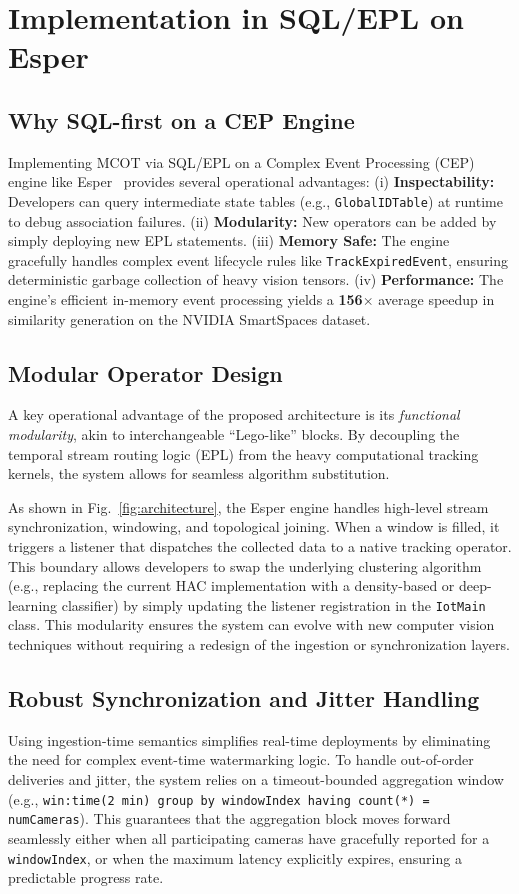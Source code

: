 \documentclass[11pt]{article}
\begin{document}
\section{Implementation in SQL/EPL on Esper}\label{sec:implementation}
\subsection{Why SQL-first on a CEP Engine}
Implementing MCOT via SQL/EPL on a Complex Event Processing (CEP) engine like Esper~\cite{espertech2024} provides several operational advantages: (i) \textbf{Inspectability:} Developers can query intermediate state tables (e.g., \texttt{GlobalIDTable}) at runtime to debug association failures. (ii) \textbf{Modularity:} New operators can be added by simply deploying new EPL statements. (iii) \textbf{Memory Safe:} The engine gracefully handles complex event lifecycle rules like \texttt{TrackExpiredEvent}, ensuring deterministic garbage collection of heavy vision tensors. (iv) \textbf{Performance:} The engine's efficient in-memory event processing yields a \textbf{156$\times$} average speedup in similarity generation on the NVIDIA SmartSpaces dataset.

\subsection{Modular Operator Design}
A key operational advantage of the proposed architecture is its \emph{functional modularity}, akin to interchangeable ``Lego-like'' blocks. By decoupling the temporal stream routing logic (EPL) from the heavy computational tracking kernels, the system allows for seamless algorithm substitution. 

As shown in Fig.~\ref{fig:architecture}, the Esper engine handles high-level stream synchronization, windowing, and topological joining. When a window is filled, it triggers a listener that dispatches the collected data to a native tracking operator. This boundary allows developers to swap the underlying clustering algorithm (e.g., replacing the current HAC implementation with a density-based or deep-learning classifier) by simply updating the listener registration in the \texttt{IotMain} class. This modularity ensures the system can evolve with new computer vision techniques without requiring a redesign of the ingestion or synchronization layers.

\subsection{Robust Synchronization and Jitter Handling}
Using ingestion-time semantics simplifies real-time deployments by eliminating the need for complex event-time watermarking logic. To handle out-of-order deliveries and jitter, the system relies on a timeout-bounded aggregation window (e.g., \texttt{win:time(2 min) group by windowIndex having count(*) = numCameras}). This guarantees that the aggregation block moves forward seamlessly either when all participating cameras have gracefully reported for a \texttt{windowIndex}, or when the maximum latency explicitly expires, ensuring a predictable progress rate.
\end{document}
